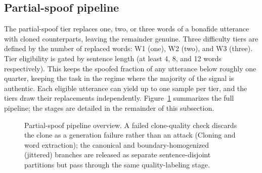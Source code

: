 \documentclass[11pt]{article}
\begin{document}
\subsection*{Partial-spoof pipeline}

The partial-spoof tier replaces one, two, or three words of a bonafide
utterance with cloned counterparts, leaving the remainder genuine. Three
difficulty tiers are defined by the number of replaced words: W1 (one),
W2 (two), and W3 (three). Tier eligibility is gated by sentence length
(at least 4, 8, and 12 words respectively). This keeps the spoofed
fraction of any utterance below roughly one quarter, keeping the task in
the regime where the majority of the signal is authentic. Each eligible
utterance can yield up to one sample per tier, and the tiers draw their
replacements independently. Figure~\ref{fig:partialpipeline} summarizes
the full pipeline; the stages are detailed in the remainder of this
subsection.

\begin{figure}[t]
\centering
{}
\caption{Partial-spoof pipeline overview. A failed clone-quality check
discards the clone as a generation failure rather than an attack
(Cloning and word extraction); the canonical and boundary-homogenized
(jittered) branches are released as separate sentence-disjoint
partitions but pass through the same quality-labeling stage.}
\label{fig:partialpipeline}
\end{figure}
\end{document}
